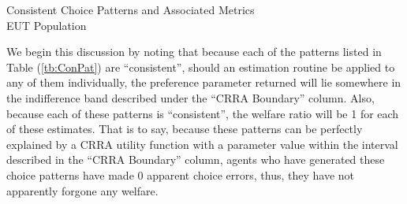 \documentclass[../main.tex]{subfiles}
\begin{document}
\begin{table}[ht]
	\centering
	\caption{Consistent Choice Patterns and Associated Metrics\\EUT Population}
	\label{tb:ConPat}
	\begin{adjustbox}{width=1\textwidth}
	\end{adjustbox}
\end{table}


We begin this discussion by noting that because each of the patterns listed in Table (\ref{tb:ConPat}) are \enquote{consistent}, should an estimation routine be applied to any of them individually, the preference parameter returned will lie somewhere in the indifference band described under the \enquote{CRRA Boundary} column.{\footnotemark} 
Also, because each of these patterns is \enquote{consistent}, the welfare ratio will be 1 for each of these estimates.
That is to say, because these patterns can be perfectly explained by a CRRA utility function with a parameter value within the interval described in the \enquote{CRRA Boundary} column, agents who have generated these choice patterns have made 0 apparent choice errors, thus, they have not apparently forgone any welfare.
\end{document}
